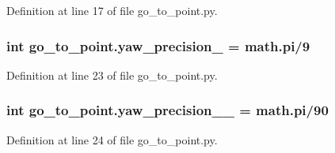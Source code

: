 Definition at line 17 of file go\+\_\+to\+\_\+point.\+py.

\subsubsection[{\texorpdfstring{yaw\+\_\+precision\+\_\+}{yaw_precision_}}]{\setlength{\rightskip}{0pt plus 5cm}int go\+\_\+to\+\_\+point.\+yaw\+\_\+precision\+\_\+ = math.\+pi/9}\hypertarget{namespacego__to__point_a67f95834f0959feb3facd17bc7fa2b38}{}\label{namespacego__to__point_a67f95834f0959feb3facd17bc7fa2b38}


Definition at line 23 of file go\+\_\+to\+\_\+point.\+py.

\subsubsection[{\texorpdfstring{yaw\+\_\+precision\+\_\+2\+\_\+}{yaw_precision_2_}}]{\setlength{\rightskip}{0pt plus 5cm}int go\+\_\+to\+\_\+point.\+yaw\+\_\+precision\+\_\+\_\+ = math.\+pi/90}\hypertarget{namespacego__to__point_af74ccf49164d0478ca8343e2031d5813}{}\label{namespacego__to__point_af74ccf49164d0478ca8343e2031d5813}


Definition at line 24 of file go\+\_\+to\+\_\+point.\+py.

